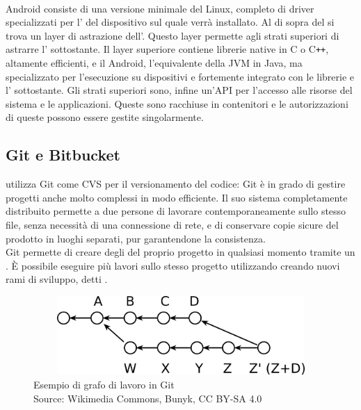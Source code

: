   \paragraph*{} Android consiste di una versione minimale del  Linux, completo di driver specializzati per l' del dispositivo sul quale verrà installato. Al di sopra del  si trova un layer di astrazione dell'. Questo layer permette agli strati superiori di astrarre l' sottostante. Il layer superiore contiene librerie native in C o C\texttt{++}, altamente efficienti, e il  Android, l'equivalente della \gls{JVM} in Java, ma specializzato per l'esecuzione su dispositivi  e fortemente integrato con le librerie e l' sottostante. Gli strati superiori sono, infine un'\gls{API} per l'accesso alle risorse del sistema e le applicazioni. Queste sono racchiuse in contenitori e le autorizzazioni di queste possono essere gestite singolarmente.

   \subsection{Git e Bitbucket}
   \nomeAzienda{} utilizza Git come \gls{CVS} per il versionamento del codice: Git è in grado di gestire progetti anche molto complessi in modo efficiente. Il suo sistema completamente distribuito permette a due persone di lavorare contemporaneamente sullo stesso file, senza necessità di una connessione di rete, e di conservare copie sicure del prodotto in luoghi separati, pur garantendone la consistenza.
   \\
   Git permette di creare degli  del proprio progetto in qualsiasi momento tramite un . È possibile eseguire più lavori sullo stesso progetto utilizzando creando nuovi rami di sviluppo, detti .
   \begin{figure}[H]
      \begin{center}
         \includegraphics[width=15cm,height=3cm,keepaspectratio]{immagini/git-branches}
      \end{center}
      \caption[Esempio di grafo di lavoro in Git]{Esempio di grafo di lavoro in Git
      \\
      Source: Wikimedia Commons, Bunyk, CC BY-SA 4.0}\label{grafogit}
   \end{figure}
